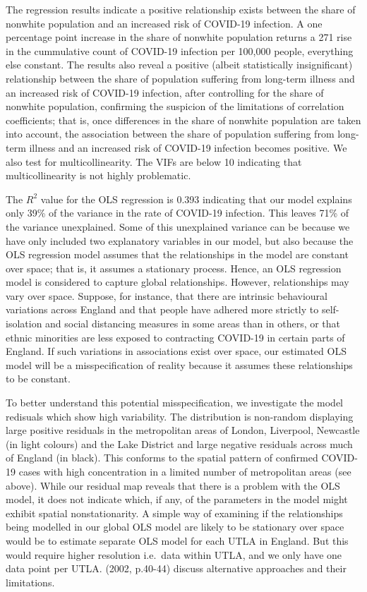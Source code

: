 \documentclass[]{book}
\begin{document}
The regression results indicate a positive relationship exists between
the share of nonwhite population and an increased risk of COVID-19
infection. A one percentage point increase in the share of nonwhite
population returns a 271 rise in the cummulative count of COVID-19
infection per 100,000 people, everything else constant. The results also
reveal a positive (albeit statistically insignificant) relationship
between the share of population suffering from long-term illness and an
increased risk of COVID-19 infection, after controlling for the share of
nonwhite population, confirming the suspicion of the limitations of
correlation coefficients; that is, once differences in the share of
nonwhite population are taken into account, the association between the
share of population suffering from long-term illness and an increased
risk of COVID-19 infection becomes positive. We also test for
multicollinearity. The VIFs are below 10 indicating that
multicollinearity is not highly problematic.

The \(R^{2}\) value for the OLS regression is 0.393 indicating that our
model explains only 39\% of the variance in the rate of COVID-19
infection. This leaves 71\% of the variance unexplained. Some of this
unexplained variance can be because we have only included two
explanatory variables in our model, but also because the OLS regression
model assumes that the relationships in the model are constant over
space; that is, it assumes a stationary process. Hence, an OLS
regression model is considered to capture global relationships. However,
relationships may vary over space. Suppose, for instance, that there are
intrinsic behavioural variations across England and that people have
adhered more strictly to self-isolation and social distancing measures
in some areas than in others, or that ethnic minorities are less exposed
to contracting COVID-19 in certain parts of England. If such variations
in associations exist over space, our estimated OLS model will be a
misspecification of reality because it assumes these relationships to be
constant.

To better understand this potential misspecification, we investigate the
model redisuals which show high variability. The distribution is
non-random displaying large positive residuals in the metropolitan areas
of London, Liverpool, Newcastle (in light colours) and the Lake District
and large negative residuals across much of England (in black). This
conforms to the spatial pattern of confirmed COVID-19 cases with high
concentration in a limited number of metropolitan areas (see above).
While our residual map reveals that there is a problem with the OLS
model, it does not indicate which, if any, of the parameters in the
model might exhibit spatial nonstationarity. A simple way of examining
if the relationships being modelled in our global OLS model are likely
to be stationary over space would be to estimate separate OLS model for
each UTLA in England. But this would require higher resolution i.e.~data
within UTLA, and we only have one data point per UTLA.
\citet{Fotheringham_et_al_2002_book} (2002, p.40-44) discuss alternative
approaches and their limitations.
\end{document}
